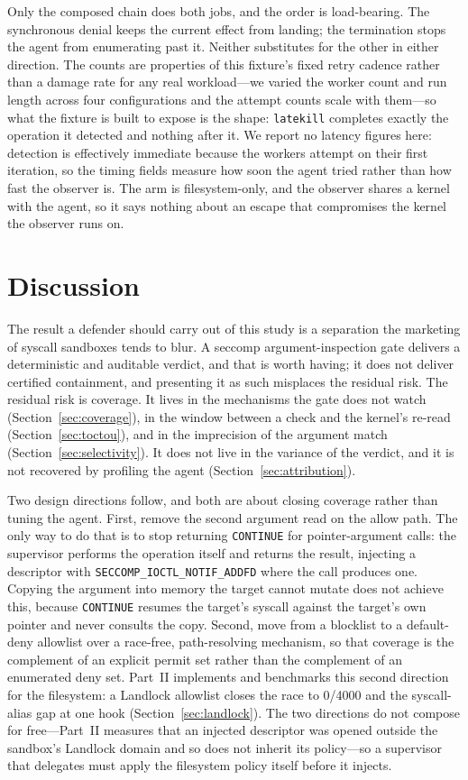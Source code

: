 \documentclass[11pt]{article}
\newcommand{\Nrace}{4000}
\begin{document}
Only the composed chain does both jobs, and the order is load-bearing. The synchronous denial keeps the
current effect from landing; the termination stops the agent from enumerating past it. Neither
substitutes for the other in either direction. The counts are properties of this fixture's fixed retry
cadence rather than a damage rate for any real workload---we varied the worker count and run length
across four configurations and the attempt counts scale with them---so what the fixture is built to
expose is the shape: \texttt{latekill} completes exactly the operation it detected and nothing after it.
We report no
latency figures here: detection is effectively immediate because the workers attempt on their first
iteration, so the timing fields measure how soon the agent tried rather than how fast the observer is.
The arm is filesystem-only, and the observer shares a kernel with the agent, so it says nothing about an
escape that compromises the kernel the observer runs on.

\section{Discussion}\label{sec:discussion}

The result a defender should carry out of this study is a separation the marketing of syscall sandboxes
tends to blur. A seccomp argument-inspection gate delivers a deterministic and auditable verdict, and that
is worth having; it does not deliver certified containment, and presenting it as such misplaces the
residual risk. The residual risk is coverage. It lives in the mechanisms the gate does not watch
(Section~\ref{sec:coverage}), in the window between a check and the kernel's re-read
(Section~\ref{sec:toctou}), and in the imprecision of the argument match (Section~\ref{sec:selectivity}).
It does not live in the variance of the verdict, and it is not recovered by profiling the agent
(Section~\ref{sec:attribution}).

Two design directions follow, and both are about closing coverage rather than tuning the agent. First,
remove the second argument read on the allow path. The only way to do that is to stop returning
\texttt{CONTINUE} for pointer-argument calls: the supervisor performs the operation itself and returns
the result, injecting a descriptor with \texttt{SECCOMP\_IOCTL\_NOTIF\_ADDFD} where the call produces
one. Copying the argument into memory the target cannot mutate does not achieve this, because
\texttt{CONTINUE} resumes the target's syscall against the target's own pointer and never consults the
copy. Second, move from a blocklist to a default-deny allowlist over a race-free,
path-resolving mechanism, so that coverage is the complement of an explicit permit set rather than the
complement of an enumerated deny set. Part~II implements and benchmarks this second direction for the
filesystem: a Landlock allowlist closes the race to 0/\Nrace{} and the syscall-alias gap at one hook
(Section~\ref{sec:landlock}). The two directions do not compose for free---Part~II measures that an
injected descriptor was opened outside the sandbox's Landlock domain and so does not inherit its
policy---so a supervisor that delegates must apply the filesystem policy itself before it injects.
\end{document}
